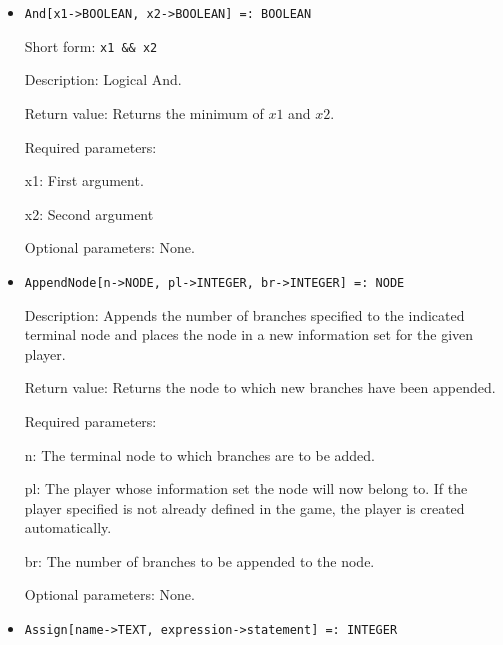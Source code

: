 \begin{itemize}
\item 
\protect \large \begin{verbatim}
And[x1->BOOLEAN, x2->BOOLEAN] =: BOOLEAN
\end{verbatim} \normalsize
  
\bd
\item
[Short form:] \verb+x1 && x2+
\item
[Description:] Logical And.
\item
[Return value:] Returns the minimum of $x1$ and $x2.$  
\item
[Required parameters:]\hfil\null
\bd
\item
[x1:] First argument.  
\item
[x2:] Second argument
\ed
\item
[Optional parameters:] None.
\ed

\item
\protect \large \begin{verbatim}
AppendNode[n->NODE, pl->INTEGER, br->INTEGER] =: NODE
\end{verbatim} \normalsize

\bd
\item
[Description:] Appends the number of branches specified to the
indicated terminal node and places the node in a new information set
for the given player.
\item
[Return value:] Returns the node to which new branches have been
appended.
\item
[Required parameters:]\hfil\null
\par
\bd
\item
[n:] The terminal node to which branches are to be added.
\item
[pl:] The player whose information set the node will now belong to.
If the player specified is not already defined in the game, the player
is created automatically.
\item
[br:] The number of branches to be appended to the node.
\ed

\item
[Optional parameters:] None.
\ed

\item 
\protect \large \begin{verbatim}
Assign[name->TEXT, expression->statement] =: INTEGER
\end{verbatim} \normalsize


\end{itemize}
